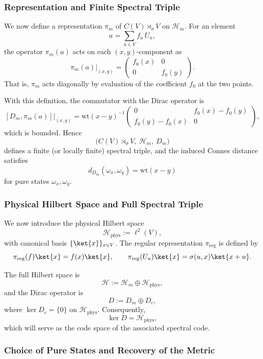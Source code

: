 \documentclass[12pt]{article}
\theoremstyle{definition} %
\theoremstyle{plain} %
\theoremstyle{remark} %
\theoremstyle{underline}
\begin{document}
\subsubsection*{Representation and Finite Spectral Triple}

We now define a representation $\pi_m$ of $C(V)\rtimes_\sigma V$ on $\mathcal H_m$. For an element
\[
    a=\sum_{u\in V} f_u\,U_u,
\]
the operator $\pi_m(a)$ acts on each $(x,y)$-component as
\[
    \pi_m(a)\big|_{(x,y)}
    =
    \begin{pmatrix}
        f_0(x) & 0 \\
        0 & f_0(y)
    \end{pmatrix}.
\]
That is, $\pi_m$ acts diagonally by evaluation of the coefficient $f_0$ at the two points.

With this definition, the commutator with the Dirac operator is
\[
    [D_m,\pi_m(a)]\big|_{(x,y)}
    =
    \mathrm{wt}(x-y)^{-1}
    \begin{pmatrix}
        0 & f_0(x)-f_0(y) \\
        f_0(y)-f_0(x) & 0
    \end{pmatrix},
\]
which is bounded. Hence
\[
    \bigl(C(V)\rtimes_\sigma V,\ \mathcal H_m,\ D_m\bigr)
\]
defines a finite (or locally finite) spectral triple, and the induced Connes distance satisfies
\[
    d_{D_m}(\omega_x,\omega_y)=\mathrm{wt}(x-y)
\]
for pure states $\omega_x,\omega_y$.

\subsubsection*{Physical Hilbert Space and Full Spectral Triple}

We now introduce the physical Hilbert space
\[
    \mathcal H_{\mathrm{phys}} := \ell^2(V),
\]
with canonical basis $\{\ket{x}\}_{x\in V}$. The regular representation $\pi_{\mathrm{reg}}$ is defined by
\[
    \pi_{\mathrm{reg}}(f)\ket{x}=f(x)\ket{x},\qquad
    \pi_{\mathrm{reg}}(U_u)\ket{x}=\sigma(u,x)\ket{x+u}.
\]

The full Hilbert space is
\[
    \mathcal H := \mathcal H_m \oplus \mathcal H_{\mathrm{phys}},
\]
and the Dirac operator is
\[
    D := D_m \oplus D_c,
\]
where $\ker D_c=\{0\}$ on $\mathcal H_{\mathrm{phys}}$. Consequently,
\[
    \ker D = \mathcal H_{\mathrm{phys}},
\]
which will serve as the code space of the associated spectral code.

\subsubsection*{Choice of Pure States and Recovery of the Metric}
\end{document}
